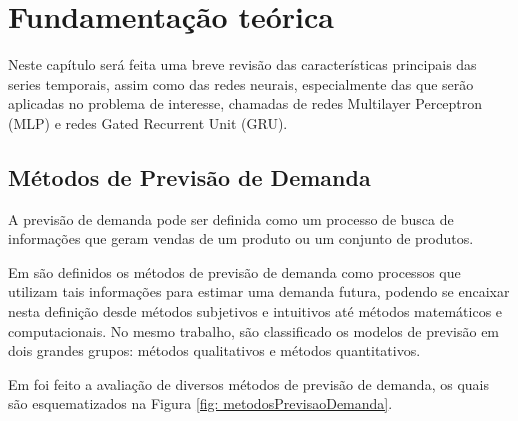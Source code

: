 \chapter{Fundamentação teórica} \label{cap:teoria}
  
Neste capítulo será feita uma breve revisão das características principais das series temporais,  assim como das redes neurais, especialmente das que serão aplicadas no problema de interesse, chamadas de redes Multilayer Perceptron (MLP) e redes Gated Recurrent Unit (GRU).  

    \section{Métodos de Previsão de Demanda} 
    
        A previsão de demanda pode ser definida como um processo de busca de informações que geram vendas de um produto ou um conjunto de produtos.
        
        Em  são definidos os métodos de previsão de demanda como processos que utilizam tais informações para estimar uma demanda futura, podendo se encaixar nesta definição desde métodos subjetivos e intuitivos até métodos matemáticos e computacionais. No mesmo trabalho, são classificado os modelos de previsão em dois grandes grupos: métodos qualitativos e métodos quantitativos.
        
         Em   foi feito a avaliação de  diversos métodos de previsão de demanda, os quais são esquematizados na Figura \ref{fig: metodosPrevisaoDemanda}. 
        
                  \begin{figure}[ht]
                  \end{figure}
        
